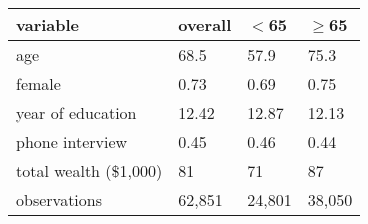 \begin{table}[ht]
	\centering
	\begin{adjustbox}{max width=1\textwidth}
		
			\begin{tabular}{llll}
				\hline \hline
				variable          & overall &  $<$65 & $\ge$65 \\ \hline
				age               & 68.5    & 57.9          & 75.3              \\
				female            & 0.73    & 0.69          & 0.75              \\
				year of education & 12.42   & 12.87         & 12.13             \\
				phone interview   & 0.45    & 0.46          & 0.44              \\
				total wealth (\$1,000)      & 81      & 71            & 87                \\ 
				\hline
					observations      & 62,851  & 24,801        & 38,050            \\
				\hline\hline
		\end{tabular}%
	\end{adjustbox}
\label{s:tb:table1}
\end{table}